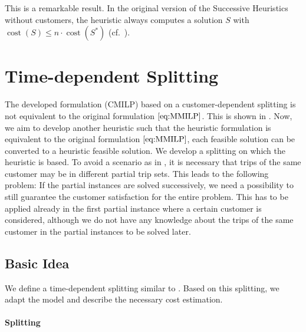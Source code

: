 This is a remarkable result. In the original version of the Successive Heuristics without customers, the heuristic always computes a solution $S$ with ${\operatorname{cost}\left(S\right)\leq n\cdot\operatorname{cost}\left(S^*\right)}$ (cf.~\cite[p.~130]{Knoll}).


\section{Time-dependent Splitting}
\label{sec:time_dependent_splitting}

The developed formulation (CMILP) based on a customer-dependent splitting is not equivalent to the original formulation $\eqref{eq:MMILP}$. This is shown in . Now, we aim to develop another heuristic such that the heuristic formulation is equivalent to the original formulation $\eqref{eq:MMILP}$, \ie each feasible solution can be converted to a heuristic feasible solution. We develop a splitting on which the heuristic is based. To avoid a scenario as in , it is necessary that trips of the same customer may be in different partial trip sets. This leads to the following problem: If the partial instances are solved successively, we need a possibility to still guarantee the customer satisfaction for the entire problem. This has to be applied already in the first partial instance where a certain customer is considered, although we do not have any knowledge about the trips of the same customer in the partial instances to be solved later.

\subsection{Basic Idea}
\label{sec:basic_idea}

We define a time-dependent splitting similar to \cite{Knoll}. Based on this splitting, we adapt the model and describe the necessary cost estimation.

\paragraph{Splitting} \parfill

